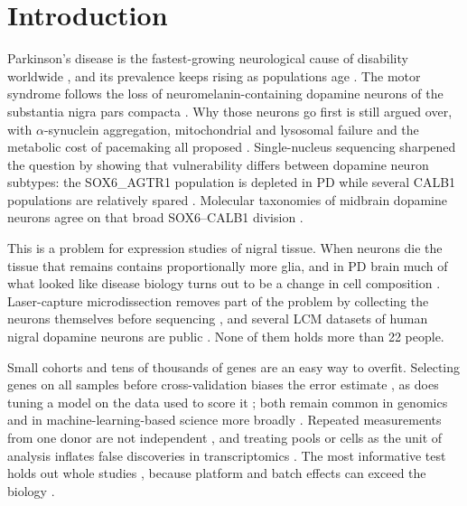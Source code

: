 \documentclass[11pt,a4paper]{article}
\begin{document}
\begin{abstract}
\noindent\textbf{Conclusions.} The panel is a reproducible set of candidate genes rather than a diagnostic
score: nine of its members survive a test in independent tissue, while most of what the classifier itself uses
is a shift in which dopamine neurons remain rather than a change inside surviving neurons. Reports of nigral expression signatures in PD
should state how much survives an explicit composition adjustment.

\medskip
\noindent\textbf{Keywords:} Parkinson's disease; substantia nigra; laser-capture microdissection; external
validation; cell composition; Boruta; SHAP; dopamine-neuron subtypes
\end{abstract}

\section{Introduction}

Parkinson's disease is the fastest-growing neurological cause of disability worldwide \citep{gbd2024}, and its
prevalence keeps rising as populations age \citep{benshlomo2024,bloem2021}. The motor syndrome follows the
loss of neuromelanin-containing dopamine neurons of the substantia nigra pars compacta \citep{kordower2013}.
Why those neurons go first is still argued over, with $\alpha$-synuclein aggregation, mitochondrial and
lysosomal failure and the metabolic cost of pacemaking all proposed \citep{morris2024,surmeier2017}.
Single-nucleus sequencing sharpened the question by showing that vulnerability differs between dopamine
neuron subtypes: the SOX6\_AGTR1 population is depleted in PD while several CALB1 populations are relatively
spared \citep{kamath2022}. Molecular taxonomies of midbrain dopamine neurons agree on that broad
SOX6--CALB1 division \citep{poulin2020}.

This is a problem for expression studies of nigral tissue. When neurons die the tissue that remains contains
proportionally more glia, and in PD brain much of what looked like disease biology turns out to be a change in
cell composition \citep{nido2020}. Laser-capture microdissection removes part of the problem by collecting the
neurons themselves before sequencing \citep{nichterwitz2016}, and several LCM datasets of human nigral
dopamine neurons are public \citep{zheng2010,tiklova2021,zaccaria2022}. None of them holds more than 22
people.

Small cohorts and tens of thousands of genes are an easy way to overfit. Selecting genes on all samples before
cross-validation biases the error estimate \citep{ambroise2002}, as does tuning a model on the data used to
score it \citep{varma2006}; both remain common in genomics and in machine-learning-based science more broadly
\citep{whalen2022,kapoor2023}. Repeated measurements from one donor are not independent \citep{hurlbert1984,
lazic2010}, and treating pools or cells as the unit of analysis inflates false discoveries in transcriptomics
\citep{squair2021,zimmerman2021}. The most informative test holds out whole studies \citep{bernau2014},
because platform and batch effects can exceed the biology \citep{leek2010}.
\end{document}
